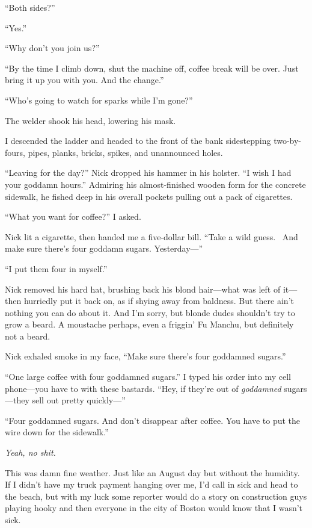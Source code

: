 ``Both sides?''

``Yes.''

``Why don't you join us?''

``By the time I climb down, shut the machine off, coffee break will be
over. Just bring it up you with you. And the change.''

``Who's going to watch for sparks while I'm gone?''

The welder shook his head, lowering his mask. ~

I descended the ladder and headed to the front of the bank sidestepping
two-by-fours, pipes, planks, bricks, spikes, and unannounced holes.

``Leaving for the day?'' Nick dropped his hammer in his holster. ``I
wish I had your goddamn hours.'' Admiring his almost-finished wooden
form for the concrete sidewalk, he fished deep in his overall pockets
pulling out a pack of cigarettes.

``What you want for coffee?'' I asked. ~

Nick lit a cigarette, then handed me a five-dollar bill. ``Take a wild
guess. ~And make sure there's four goddamn sugars. Yesterday---''

``I put them four in myself.''

Nick removed his hard hat, brushing back his blond hair---what was left
of it---then hurriedly put it back on, as if shying away from baldness.
But there ain't nothing you can do about it. And I'm sorry, but blonde
dudes shouldn't try to grow a beard. A moustache perhaps, even a
friggin' Fu Manchu, but definitely not a beard. ~

Nick exhaled smoke in my face, ``Make sure there's four goddamned
sugars.''

``One large coffee with four goddamned sugars.'' I typed his order into
my cell phone---you have to with these bastards. ``Hey, if they're out
of \emph{goddamned} sugars---they sell out pretty quickly---''

``Four goddamned sugars. And don't disappear after coffee. You have to
put the wire down for the sidewalk.''

\emph{Yeah, no shit.}

This was damn fine weather. Just like an August day but without the
humidity. If I didn't have my truck payment hanging over me, I'd call in
sick and head to the beach, but with my luck some reporter would do a
story on construction guys playing hooky and then everyone in the city
of Boston would know that I wasn't sick.

